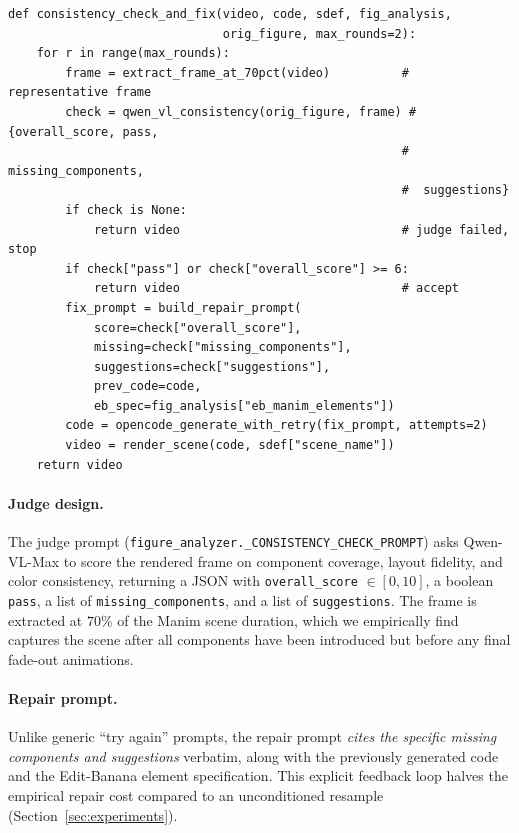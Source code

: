 \documentclass[11pt,a4paper]{article}
\begin{document}
\begin{lstlisting}[caption={Closed-loop visual-consistency repair (simplified pseudocode).}, label={alg:consistency}]
def consistency_check_and_fix(video, code, sdef, fig_analysis,
                              orig_figure, max_rounds=2):
    for r in range(max_rounds):
        frame = extract_frame_at_70pct(video)          # representative frame
        check = qwen_vl_consistency(orig_figure, frame) # {overall_score, pass,
                                                       #  missing_components,
                                                       #  suggestions}
        if check is None:
            return video                               # judge failed, stop
        if check["pass"] or check["overall_score"] >= 6:
            return video                               # accept
        fix_prompt = build_repair_prompt(
            score=check["overall_score"],
            missing=check["missing_components"],
            suggestions=check["suggestions"],
            prev_code=code,
            eb_spec=fig_analysis["eb_manim_elements"])
        code = opencode_generate_with_retry(fix_prompt, attempts=2)
        video = render_scene(code, sdef["scene_name"])
    return video
\end{lstlisting}

\paragraph{Judge design.}
The judge prompt (\texttt{figure\_analyzer.\_CONSISTENCY\_CHECK\_PROMPT}) asks Qwen-VL-Max to score the rendered frame on component coverage, layout fidelity, and color consistency, returning a JSON with \texttt{overall\_score} $\in [0,10]$, a boolean \texttt{pass}, a list of \texttt{missing\_components}, and a list of \texttt{suggestions}. The frame is extracted at $70\%$ of the Manim scene duration, which we empirically find captures the scene after all components have been introduced but before any final fade-out animations.

\paragraph{Repair prompt.}
Unlike generic ``try again'' prompts, the repair prompt \emph{cites the specific missing components and suggestions} verbatim, along with the previously generated code and the Edit-Banana element specification. This explicit feedback loop halves the empirical repair cost compared to an unconditioned resample (Section~\ref{sec:experiments}).
\end{document}

